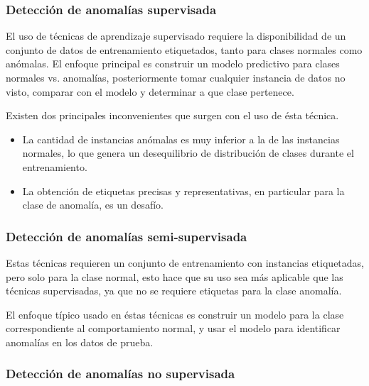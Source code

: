\subsubsection{Detecci\'{o}n de anomal\'{i}as supervisada}

El uso de t\'{e}cnicas de aprendizaje supervisado requiere la disponibilidad de un conjunto de datos de entrenamiento etiquetados, tanto para clases normales como an\'{o}malas. El enfoque principal es construir un modelo predictivo para clases normales vs. anomal\'{i}as, posteriormente tomar cualquier instancia de datos no visto, comparar con el modelo y determinar a que clase pertenece.

\vspace{5mm} %

Existen dos principales inconvenientes que surgen con el uso de \'{e}sta t\'{e}cnica.

\begin{itemize}
\item La cantidad de instancias an\'{o}malas es muy inferior a la de las instancias normales, lo que genera un desequilibrio de distribuci\'{o}n de clases durante el entrenamiento.
\item La obtenci\'{o}n de etiquetas precisas y representativas, en particular para la clase de anomal\'{i}a, es un desaf\'{i}o.
\end{itemize}

\subsubsection{Detecci\'{o}n de anomal\'{i}as semi-supervisada}

Estas t\'{e}cnicas requieren un conjunto de entrenamiento con instancias etiquetadas, pero solo para la clase normal, esto hace que su uso sea m\'{a}s aplicable que las t\'{e}cnicas supervisadas, ya que no se requiere etiquetas para la clase anomal\'{i}a.

\vspace{5mm} %

El enfoque típico usado en \'{e}stas técnicas es construir un modelo para la clase correspondiente al comportamiento normal, y usar el modelo para identificar anomalías en los datos de prueba.

\subsubsection{Detecci\'{o}n de anomal\'{i}as no supervisada}

